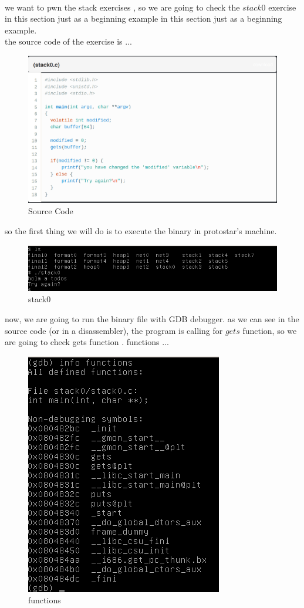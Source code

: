 \documentclass[10pt,a4paper]{article} %
\begin{document}
                \\ we want to pwn the stack exercises , so we are going to check
                the $ stack0  $ exercise in this section just as a beginning
                example  in this section just as a beginning example.
                \\ the source code of the exercise is ...
                \begin{figure}[h!]
                    \centering
                    \includegraphics[width=0.5\linewidth]{source.png}
                    \caption{Source Code}
                    \label{fig:source}
                \end{figure}
                so the first thing we will do is to execute the binary in
                protostar's machine.
                \begin{figure}[h!]
                    \centering
                    \includegraphics[width=0.5\linewidth]{stack0}
                    \caption{stack0}
                    \label{fig:stack0}
                \end{figure}
                \newpage
                now, we are going to run the binary file with GDB debugger. as we
                can see in the source code (or in a disassembler), the program is calling for $ gets  $
                function, so we are going to check gets function .
                functions ...
                \begin{figure}[h!]
                    \centering
                    \includegraphics[width=0.5\linewidth]{protofun}
                    \caption{functions }
                    \label{fig:protofun}
                \end{figure}
\end{document}
